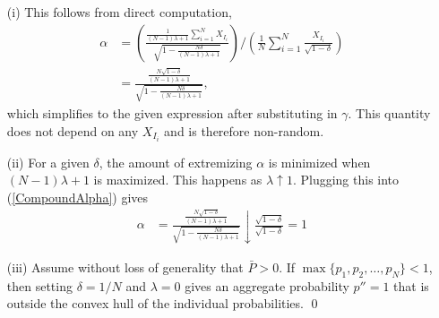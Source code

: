 \documentclass[11pt]{article}
\theoremstyle{definition}
\theoremstyle{definition}
\begin{document}
\begin{enumerate}
\item[(i)] This follows from direct computation,
\begin{align}
\alpha &= \left( \frac{\frac{1}{(N-1)\lambda +1} 
  \sum_{i=1}^N X_{I_i} }{\sqrt{1- \frac{N\delta}{(N-1)\lambda +1} }} \right) \Big/ \left( \frac{1}{N} \sum_{i=1}^N \frac{X_{I_i}}{\sqrt{1-\delta}} \right) \nonumber \\
&=    \frac{\frac{N\sqrt{1-\delta}}{(N-1)\lambda +1} 
   }{\sqrt{1- \frac{N\delta}{(N-1)\lambda +1} }}, \label{CompoundAlpha}
\end{align}
which simplifies to the given expression after substituting in $\gamma$. This quantity does not depend on any $X_{I_i}$ and is therefore non-random.

\item[(ii)] For a given $\delta$, the amount of extremizing $\alpha$ is minimized when $(N-1)\lambda +1$ is maximized. This happens as $\lambda \uparrow 1$. Plugging this into (\ref{CompoundAlpha}) gives
\begin{align*}
\alpha &= \frac{\frac{N\sqrt{1-\delta}}{(N-1)\lambda +1}}{\sqrt{1- \frac{N\delta}{(N-1)\lambda +1} }}  \downarrow \frac{\sqrt{1-\delta}}{\sqrt{1-\delta }} = 1
\end{align*}
\item[(iii)] Assume without loss of generality that $\bar{P} > 0$. If $\max\{p_1, p_2, \dots, p_N \} < 1$, then  setting $\delta = 1/N$ and $\lambda = 0$ gives an aggregate probability $p'' = 1$ that is outside the convex hull of the individual probabilities.
\qed
\end{enumerate}
\end{document}
